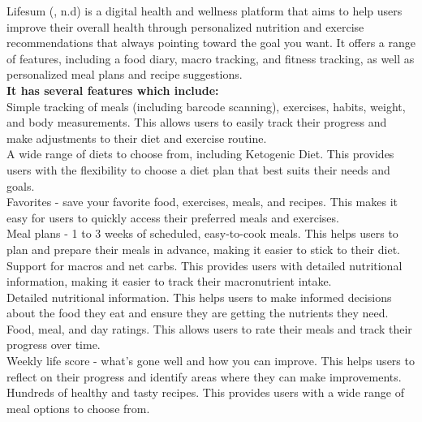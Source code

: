 \documentclass {article}
\begin{document}
Lifesum (, n.d) is a digital health and wellness platform that aims to help users improve their overall health through personalized nutrition and exercise recommendations that always pointing toward the goal you want. It offers a range of features, including a food diary, macro tracking, and fitness tracking, as well as personalized meal plans and recipe suggestions.\\

\noindent \textbf{It has several features which include: \\}
\noindent Simple tracking of meals (including barcode scanning), exercises, habits, weight, and body measurements. This allows users to easily track their progress and make adjustments to their diet and exercise routine.\\

\noindent A wide range of diets to choose from, including Ketogenic Diet. This provides users with the flexibility to choose a diet plan that best suits their needs and goals.\\

\noindent Favorites - save your favorite food, exercises, meals, and recipes. This makes it easy for users to quickly access their preferred meals and exercises.\\

\noindent Meal plans - 1 to 3 weeks of scheduled, easy-to-cook meals. This helps users to plan and prepare their meals in advance, making it easier to stick to their diet.\\

\noindent Support for macros and net carbs. This provides users with detailed nutritional information, making it easier to track their macronutrient intake.\\

\noindent Detailed nutritional information. This helps users to make informed decisions about the food they eat and ensure they are getting the nutrients they need.\\

\noindent Food, meal, and day ratings. This allows users to rate their meals and track their progress over time.\\

\noindent Weekly life score - what’s gone well and how you can improve. This helps users to reflect on their progress and identify areas where they can make improvements.\\

\noindent Hundreds of healthy and tasty recipes. This provides users with a wide range of meal options to choose from.\\
\end{document}
